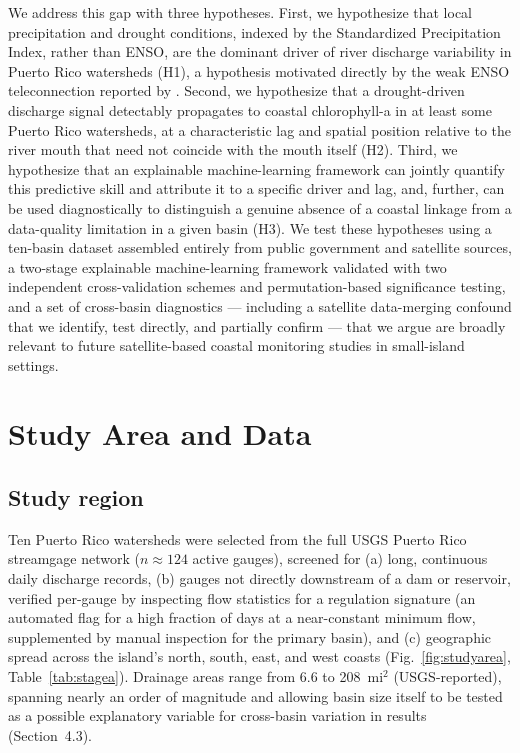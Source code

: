 \documentclass[preprint,12pt]{elsarticle}
\begin{document}
We address this gap with three hypotheses. First, we hypothesize that local precipitation and drought conditions, indexed by the Standardized Precipitation Index, rather than ENSO, are the dominant driver of river discharge variability in Puerto Rico watersheds (H1), a hypothesis motivated directly by the weak ENSO teleconnection reported by \citet{torresvalcarcel2018enso}. Second, we hypothesize that a drought-driven discharge signal detectably propagates to coastal chlorophyll-a in at least some Puerto Rico watersheds, at a characteristic lag and spatial position relative to the river mouth that need not coincide with the mouth itself (H2). Third, we hypothesize that an explainable machine-learning framework can jointly quantify this predictive skill and attribute it to a specific driver and lag, and, further, can be used diagnostically to distinguish a genuine absence of a coastal linkage from a data-quality limitation in a given basin (H3). We test these hypotheses using a ten-basin dataset assembled entirely from public government and satellite sources, a two-stage explainable machine-learning framework validated with two independent cross-validation schemes and permutation-based significance testing, and a set of cross-basin diagnostics --- including a satellite data-merging confound that we identify, test directly, and partially confirm --- that we argue are broadly relevant to future satellite-based coastal monitoring studies in small-island settings.

\section{Study Area and Data}

\subsection{Study region}
Ten Puerto Rico watersheds were selected from the full USGS Puerto Rico streamgage network ($n\approx124$ active gauges), screened for (a) long, continuous daily discharge records, (b) gauges not directly downstream of a dam or reservoir, verified per-gauge by inspecting flow statistics for a regulation signature (an automated flag for a high fraction of days at a near-constant minimum flow, supplemented by manual inspection for the primary basin), and (c) geographic spread across the island's north, south, east, and west coasts (Fig.~\ref{fig:studyarea}, Table~\ref{tab:stagea}). Drainage areas range from 6.6 to 208~mi$^2$ (USGS-reported), spanning nearly an order of magnitude and allowing basin size itself to be tested as a possible explanatory variable for cross-basin variation in results (Section~4.3).
\end{document}
